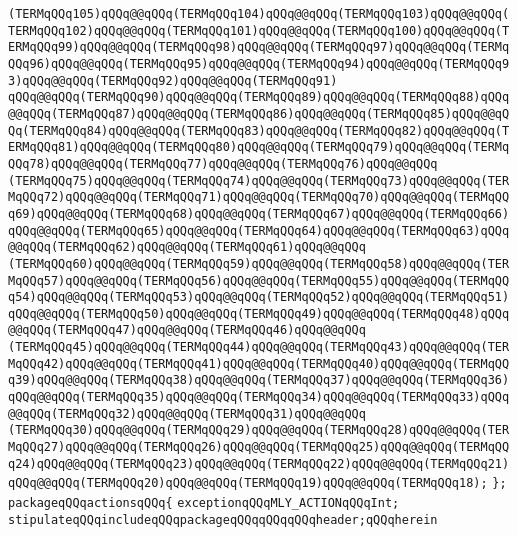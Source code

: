 \verb|(TERMqQQq105)qQQq@@qQQq(TERMqQQq104)qQQq@@qQQq(TERMqQQq103)qQQq@@qQQq(TERMqQQq102)qQQq@@qQQq(TERMqQQq101)qQQq@@qQQq(TERMqQQq100)qQQq@@qQQq(TERMqQQq99)qQQq@@qQQq(TERMqQQq98)qQQq@@qQQq(TERMqQQq97)qQQq@@qQQq(TERMqQQq96)qQQq@@qQQq(TERMqQQq95)qQQq@@qQQq(TERMqQQq94)qQQq@@qQQq(TERMqQQq93)qQQq@@qQQq(TERMqQQq92)qQQq@@qQQq(TERMqQQq91)|\newline
\verb|qQQq@@qQQq(TERMqQQq90)qQQq@@qQQq(TERMqQQq89)qQQq@@qQQq(TERMqQQq88)qQQq@@qQQq(TERMqQQq87)qQQq@@qQQq(TERMqQQq86)qQQq@@qQQq(TERMqQQq85)qQQq@@qQQq(TERMqQQq84)qQQq@@qQQq(TERMqQQq83)qQQq@@qQQq(TERMqQQq82)qQQq@@qQQq(TERMqQQq81)qQQq@@qQQq(TERMqQQq80)qQQq@@qQQq(TERMqQQq79)qQQq@@qQQq(TERMqQQq78)qQQq@@qQQq(TERMqQQq77)qQQq@@qQQq(TERMqQQq76)qQQq@@qQQq|\newline
\verb|(TERMqQQq75)qQQq@@qQQq(TERMqQQq74)qQQq@@qQQq(TERMqQQq73)qQQq@@qQQq(TERMqQQq72)qQQq@@qQQq(TERMqQQq71)qQQq@@qQQq(TERMqQQq70)qQQq@@qQQq(TERMqQQq69)qQQq@@qQQq(TERMqQQq68)qQQq@@qQQq(TERMqQQq67)qQQq@@qQQq(TERMqQQq66)qQQq@@qQQq(TERMqQQq65)qQQq@@qQQq(TERMqQQq64)qQQq@@qQQq(TERMqQQq63)qQQq@@qQQq(TERMqQQq62)qQQq@@qQQq(TERMqQQq61)qQQq@@qQQq|\newline
\verb|(TERMqQQq60)qQQq@@qQQq(TERMqQQq59)qQQq@@qQQq(TERMqQQq58)qQQq@@qQQq(TERMqQQq57)qQQq@@qQQq(TERMqQQq56)qQQq@@qQQq(TERMqQQq55)qQQq@@qQQq(TERMqQQq54)qQQq@@qQQq(TERMqQQq53)qQQq@@qQQq(TERMqQQq52)qQQq@@qQQq(TERMqQQq51)qQQq@@qQQq(TERMqQQq50)qQQq@@qQQq(TERMqQQq49)qQQq@@qQQq(TERMqQQq48)qQQq@@qQQq(TERMqQQq47)qQQq@@qQQq(TERMqQQq46)qQQq@@qQQq|\newline
\verb|(TERMqQQq45)qQQq@@qQQq(TERMqQQq44)qQQq@@qQQq(TERMqQQq43)qQQq@@qQQq(TERMqQQq42)qQQq@@qQQq(TERMqQQq41)qQQq@@qQQq(TERMqQQq40)qQQq@@qQQq(TERMqQQq39)qQQq@@qQQq(TERMqQQq38)qQQq@@qQQq(TERMqQQq37)qQQq@@qQQq(TERMqQQq36)qQQq@@qQQq(TERMqQQq35)qQQq@@qQQq(TERMqQQq34)qQQq@@qQQq(TERMqQQq33)qQQq@@qQQq(TERMqQQq32)qQQq@@qQQq(TERMqQQq31)qQQq@@qQQq|\newline
\verb|(TERMqQQq30)qQQq@@qQQq(TERMqQQq29)qQQq@@qQQq(TERMqQQq28)qQQq@@qQQq(TERMqQQq27)qQQq@@qQQq(TERMqQQq26)qQQq@@qQQq(TERMqQQq25)qQQq@@qQQq(TERMqQQq24)qQQq@@qQQq(TERMqQQq23)qQQq@@qQQq(TERMqQQq22)qQQq@@qQQq(TERMqQQq21)qQQq@@qQQq(TERMqQQq20)qQQq@@qQQq(TERMqQQq19)qQQq@@qQQq(TERMqQQq18);|\newline
\verb|};|\newline
\verb|packageqQQqactionsqQQq{|\newline
\verb|exceptionqQQqMLY_ACTIONqQQqInt;|\newline
\verb|stipulateqQQqincludeqQQqpackageqQQqqQQqqQQqheader;qQQqherein|\newline
